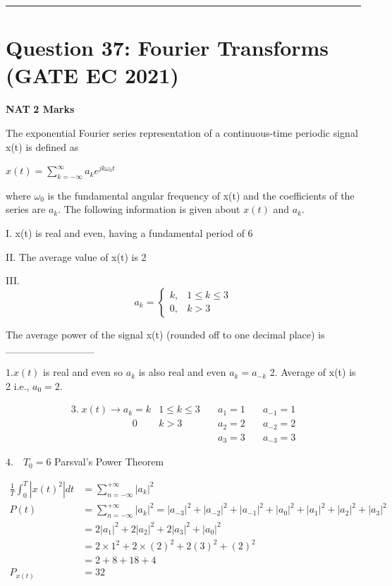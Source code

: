 \documentclass[11pt,a4paper]{article}
\begin{document}
\vspace{1.5em}
\hrule
\vspace{1.5em}

\section*{Question 37: Fourier Transforms (GATE EC 2021)}
\noindent \textbf{\color{primary}NAT} \hfill \textbf{\color{secondary}2 Marks}


\noindent The exponential Fourier series representation of a continuous-time periodic signal x(t) is defined as

$x\left ( t \right )=\sum_{k=-\infty }^{\infty }a_{k}e^{jk\omega _{0}t}$

where $\omega _0$ is the fundamental angular frequency of x(t) and the coefficients of the series are $a_{k}$. The following information is given about $x(t)$
and $a_{k}$.

I.    x(t) is real and even, having a fundamental period of 6

II.  The average value of x(t) is 2

III. 
\[
a_{k}=\left\{\begin{matrix} k, & 1\leq k\leq 3\\ 0,& k> 3 \end{matrix}\right.
\]

The average power of the signal x(t) (rounded off to one decimal place) is \_\_\_\_\_\_\_\_\_\_\_\_


\begin{tcolorbox}[solbox, title=Detailed Solution -- Question 37]
$1. x(t)$ is real and even so $a_{k}$ is also real and even $a_{k}=a_{-k}$
 2. Average of x(t) is 2 i.e., $a_{0}=2.$

\[
\begin{array}{llll} 3. \;x(t) \rightarrow a_{k}=k &1 \leq k \leq 3 \quad& a_{1}=1 \quad& a_{-1}=1 \\  \quad \quad \quad \quad \;\;\;\;\;\;\;\;0 & k>3 & a_{2}=2 & a_{-2}=2 \\ && a_{3}=3 & a_{-3}=3 \end{array}
\]

$4. \quad T_{0}=6$
 Parsval's Power Theorem 

\[
\begin{aligned} \frac{1}{T} \int_{0}^{T}\left|x(t)^{2}\right| d t &=\sum_{n=-\infty}^{+\infty}\left|a_{k}\right|^{2} \\ P(t) &=\sum_{n=-\infty}^{+\infty}\left|a_{k}\right|^{2}=\left|a_{-3}\right|^{2}+\left|a_{-2}\right|^{2}+\left|a_{-1}\right|^{2}+\left|a_{0}\right|^{2}+\left|a_{1}\right|^{2}+\left|a_{2}\right|^{2}+\left|a_{3}\right|^{2} \\ &=2\left|a_{1}\right|^{2}+2\left|a_{2}\right|^{2}+2\left|a_{3}\right|^{2}+\left|a_{0}\right|^{2} \\ &=2 \times 1^{2}+2 \times(2)^{2}+2(3)^{2}+(2)^{2} \\ &=2+8+18+4 \\ P_{x(t)} &=32 \end{aligned}
\]
\end{tcolorbox}
\end{document}
